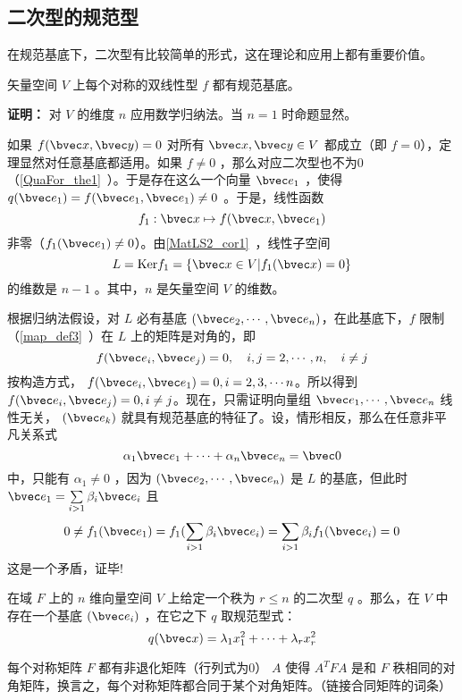 
\subsection{二次型的规范型}
在规范基底下，二次型有比较简单的形式，这在理论和应用上都有重要价值。
\begin{theorem}{}\label{GuaOQu_the1}
矢量空间 $V$ 上每个对称的双线性型 $f$ 都有规范基底。
\end{theorem}
\textbf{证明：} 对 $V$ 的维度 $n$ 应用数学归纳法。当 $n=1$ 时命题显然。

如果 $f(\bvec x,\bvec y)=0$ 对所有 $\bvec x,\bvec y\in V$ 都成立（即 $f=0$），定理显然对任意基底都适用。如果 $f\neq 0$ ，那么对应二次型也不为0（\autoref{QuaFor_the1}~）。于是存在这么一个向量 $\bvec e_1$ ，使得 $q(\bvec e_1)=f(\bvec e_1,\bvec e_1)\neq0$ 。于是，线性函数
\begin{equation}
f_1:\bvec x\mapsto f(\bvec x,\bvec e_1)
\end{equation}
非零（$f_1(\bvec e_1)\neq0$）。由\autoref{MatLS2_cor1}~，线性子空间
\begin{equation}
L=\mathrm{Ker} f_1=\{\bvec x\in V|f_1(\bvec x)=0\}
\end{equation}
的维数是 $n-1$ 。其中，$n$ 是矢量空间 $V$ 的维数。

根据归纳法假设，对 $L$ 必有基底 $(\bvec e_2,\cdots,\bvec e_n)$，在此基底下，$f$ 限制（\autoref{map_def3}~）在 $L$ 上的矩阵是对角的，即 
\begin{equation}
f(\bvec e_i,\bvec e_j)=0,\quad i,j=2,\cdots ,n,\quad i\neq j
\end{equation}
按构造方式， $f(\bvec e_i,\bvec e_1)=0,i=2,3,\cdots n$。所以得到 $f(\bvec e_i,\bvec e_j)=0,i\neq j$。现在，只需证明向量组 $\bvec e_1,\cdots,\bvec e_n$ 线性无关， $(\bvec e_k)$ 就具有规范基底的特征了。设，情形相反，那么在任意非平凡关系式
\begin{equation}
\alpha_1\bvec e_1+\cdots+\alpha_n\bvec e_n=\bvec 0
\end{equation}
中，只能有 $\alpha_1\neq0$ ，因为 $(\bvec e_2,\cdots ,\bvec e_n)$ 是 $L$ 的基底，但此时 $\bvec e_1=\sum\limits_{i>1}\beta _i\bvec e_i$ 且
\begin{equation}
0\neq f_1(\bvec e_1)=f_1(\sum\limits_{i>1}\beta_i\bvec e_i)=\sum\limits_{i>1}\beta_if_1(\bvec e_i)=0
\end{equation}
这是一个矛盾，证毕!
\begin{corollary}{}
在域 $F$ 上的 $n$ 维向量空间 $V$ 上给定一个秩为 $r\leq n$ 的二次型 $q$ 。那么，在 $V$ 中存在一个基底 $(\bvec e_i)$ ，在它之下 $q$ 取规范型式：
\begin{equation}\label{GuaOQu_eq1}
q(\bvec x)=\lambda_1 x_1^2+\cdots+\lambda_r x_r^2
\end{equation}

\end{corollary}
\begin{corollary}{}
每个对称矩阵 $F$ 都有非退化矩阵（行列式为0） $A$ 使得 $A^{T}FA$ 是和 $F$ 秩相同的对角矩阵，换言之，每个对称矩阵都合同于某个对角矩阵。（链接合同矩阵的词条） 
\end{corollary}
